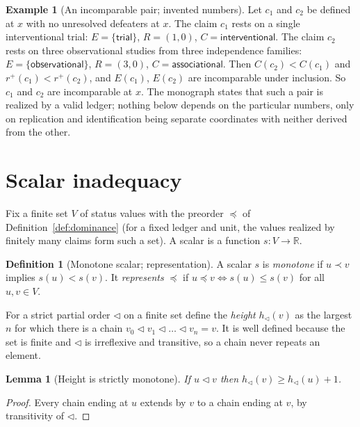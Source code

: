 \documentclass[11pt]{article}
\theoremstyle{plain}
\newtheorem{lemma}[theorem]{Lemma}
\theoremstyle{definition}
\newtheorem{definition}[theorem]{Definition}
\newtheorem{example}[theorem]{Example}
\theoremstyle{remark}
\newcommand{\R}{\mathbb R}
\begin{document}
\begin{example}[An incomparable pair; invented numbers]\label{ex:incomparable}
Let $c_1$ and $c_2$ be defined at $x$ with no unresolved defeaters at $x$. The claim $c_1$ rests on a single interventional trial: $E=\{\textsf{trial}\}$, $R=(1,0)$, $C=\textsf{interventional}$. The claim $c_2$ rests on three observational studies from three independence families: $E=\{\textsf{observational}\}$, $R=(3,0)$, $C=\textsf{associational}$. Then $C(c_2)<C(c_1)$ and $r^+(c_1)<r^+(c_2)$, and $E(c_1)$, $E(c_2)$ are incomparable under inclusion. So $c_1$ and $c_2$ are incomparable at $x$. The monograph states that such a pair is realized by a valid ledger; nothing below depends on the particular numbers, only on replication and identification being separate coordinates with neither derived from the other.
\end{example}

\section{Scalar inadequacy}\label{sec:scalar}

Fix a finite set $V$ of status values with the preorder $\preceq$ of Definition~\ref{def:dominance} (for a fixed ledger and unit, the values realized by finitely many claims form such a set). A scalar is a function $s:V\to\R$.

\begin{definition}[Monotone scalar; representation]\label{def:monotone}
A scalar $s$ is \emph{monotone} if $u\prec v$ implies $s(u)<s(v)$. It \emph{represents} $\preceq$ if $u\preceq v\Leftrightarrow s(u)\le s(v)$ for all $u,v\in V$.
\end{definition}

For a strict partial order $\lhd$ on a finite set define the \emph{height} $h_\lhd(v)$ as the largest $n$ for which there is a chain $v_0\lhd v_1\lhd\dots\lhd v_n=v$. It is well defined because the set is finite and $\lhd$ is irreflexive and transitive, so a chain never repeats an element.

\begin{lemma}[Height is strictly monotone]\label{lem:height}
If $u\lhd v$ then $h_\lhd(v)\ge h_\lhd(u)+1$.
\end{lemma}

\begin{proof}
Every chain ending at $u$ extends by $v$ to a chain ending at $v$, by transitivity of $\lhd$.
\end{proof}
\end{document}
